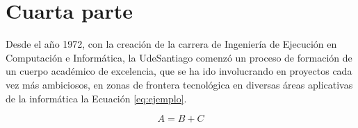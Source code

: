 \section{Cuarta parte}
\label{sec:cuarta}
Desde el año 1972, con la creación de la carrera de Ingeniería de Ejecución en Computación e Informática, la UdeSantiago comenzó un proceso  de formación de un cuerpo académico de excelencia, que se ha ido involucrando en proyectos cada vez más ambiciosos, en zonas de frontera tecnológica en diversas áreas aplicativas de la informática la Ecuación \ref{eq:ejemplo}.

\begin{equation}
	A = B + C
\label{eq:ejemplo}
\end{equation}

